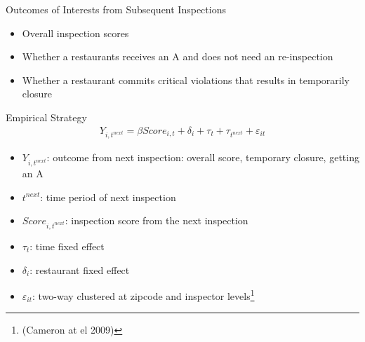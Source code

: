 \documentclass[handout]{beamer}
\begin{document}
\begin{frame}{Outcomes of Interests from Subsequent Inspections}
\begin{itemize}
\item Overall inspection scores
\item Whether a restaurants receives an A and does not need an re-inspection
\item Whether a restaurant commits critical violations that results in temporarily closure
\end{itemize}
\end{frame}

\begin{frame}{Empirical Strategy}
    \begin{align*}
        Y_{i,t^{next}} = \beta Score_{i,t} + \delta_i + \tau_{t} + \tau_{t^{next}} + \varepsilon_{it}
    \end{align*}
    \begin{itemize}
    \item $Y_{i,t^{next}}$: outcome from next inspection: overall score, temporary closure, getting an A
    \item $t^{next}$: time period of next inspection
    \item $Score_{i,t^{next}}$: inspection score from the next inspection
    \item $\tau_t$: time fixed effect
    \item $\delta_i$: restaurant fixed effect
    \item $\varepsilon_{it}$: two-way clustered at zipcode and inspector levels\footnote{ (Cameron at el 2009)}
    \end{itemize}
\end{frame}
\end{document}
